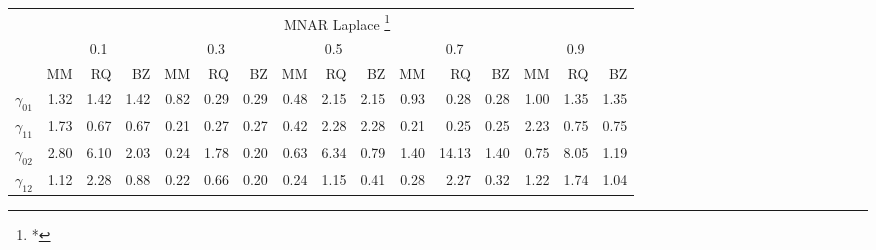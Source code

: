 \documentclass[12pt]{article}
\begin{document}
\begin{table}[h]
  \begin{tabular}{rrrrrrrrrrrrrrrr}
    \toprule
    & \multicolumn{15}{c}{MNAR Laplace \footnote{*}} \\
    \cline{2-16}
    &  \multicolumn{3}{c}{0.1} &  \multicolumn{3}{c}{0.3} &  \multicolumn{3}{c}{0.5} &
    \multicolumn{3}{c}{0.7} &  \multicolumn{3}{c}{0.9} \\
    \cline{2-16}
    & MM   & RQ   & BZ   & MM   & RQ   & BZ   & MM   & RQ   & BZ   & MM   & RQ   & BZ   & MM   & RQ   & BZ   \\
    \hline
    $\gamma_{01}$ & 1.32 & 1.42 & 1.42 & 0.82 & 0.29 & 0.29 & 0.48 & 2.15 & 2.15 & 0.93 & 0.28 & 0.28 & 1.00 & 1.35 & 1.35  \\
    $\gamma_{11}$ & 1.73 & 0.67 & 0.67 & 0.21 & 0.27 & 0.27 & 0.42 & 2.28 & 2.28 & 0.21 & 0.25 & 0.25 & 2.23 & 0.75 & 0.75  \\
    $\gamma_{02}$ & 2.80 & 6.10 & 2.03 & 0.24 & 1.78 & 0.20 & 0.63 & 6.34 & 0.79 & 1.40 & 14.13 & 1.40 & 0.75 & 8.05 & 1.19 \\
    $\gamma_{12}$ & 1.12 & 2.28 & 0.88 & 0.22 & 0.66 & 0.20 & 0.24 & 1.15 & 0.41 & 0.28 & 2.27 & 0.32 & 1.22 & 1.74 & 1.04  \\
    \bottomrule
  \end{tabular}

\end{table}
\end{document}
